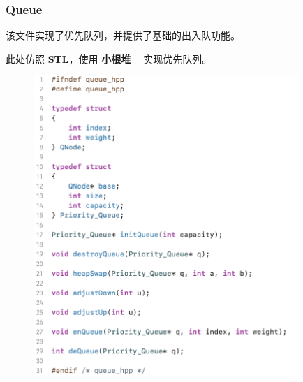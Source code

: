         \subsubsection{Queue}
            \par 该文件实现了优先队列，并提供了基础的出入队功能。
            \par 此处仿照 \textbf{STL}，使用 \textbf{小根堆 \ } 实现优先队列。
            \begin{figure}[htbp]
                \hspace*{1.2cm}
                \includegraphics*[width = 10cm]{ffff.png}
            \end{figure}
